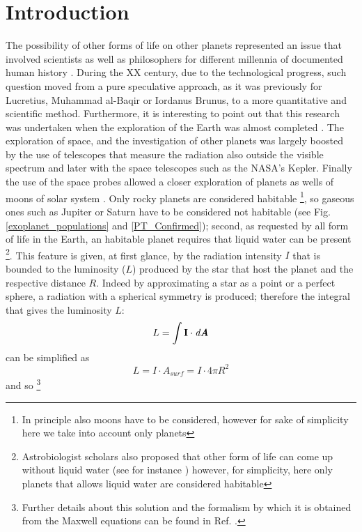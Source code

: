\documentclass[
12pt, %
a4paper, %
oneside, %
headinclude,footinclude, %
BCOR5mm, %
]{scrartcl}
\begin{document}
\section{Introduction}
The possibility of other forms of life on other planets represented an issue that involved scientists as well as philosophers for different millennia of documented human history \cite{papagiannis1985historical}. During the XX century, due to the technological progress, such question moved from a pure speculative approach, as it was previously for Lucretius, Muhammad al-Baqir or Iordanus Brunus, to a more quantitative and scientific method. Furthermore, it is interesting to point out that this research was undertaken when the exploration of the Earth was almost completed \cite{fleming2001barrow}. The exploration of space, and the investigation of other planets was largely boosted by the use of telescopes that measure the radiation also outside the visible spectrum and later with the space telescopes such as the NASA's Kepler. Finally the use of the space probes allowed a closer exploration of planets as wells of moons of solar system \cite{space_probes}. 
Only rocky planets are considered habitable \footnote{In principle also moons have to be considered, however for sake of simplicity here we take into account only planets}, so gaseous ones such as Jupiter or Saturn have to be considered not habitable (see Fig. \ref{exoplanet_populations} and \ref{PT_Confirmed}); second, as requested by all form of life in the Earth, an habitable planet requires that liquid water can be present \cite{seager2013exoplanet,mckay2014requirements,rothschild2001life} \footnote{Astrobiologist scholars also proposed that other form of life can come up without liquid water (see for instance \cite{rahm2016polymorphism}) however, for simplicity, here only planets that allows liquid water are considered habitable}. This feature is given, at first glance, by the radiation intensity $I$ that is bounded to the luminosity ($L$) produced by the star that host the planet and the respective distance $R$. Indeed by approximating a star as a point or a perfect sphere, a radiation with a spherical symmetry is produced; therefore the integral that gives the luminosity $L$: 
\begin{equation}
L=\int \textbf{I}\cdot \textit{d\textbf{A}}
\end{equation}
can be simplified as 
\begin{equation}
L= I \cdot A_{surf}=I\cdot4\pi R^{2}
\end{equation}
and so  \footnote{Further details about this solution and the formalism by which it is obtained from the Maxwell equations can be found in Ref. \cite{feynman}.}
\end{document}
